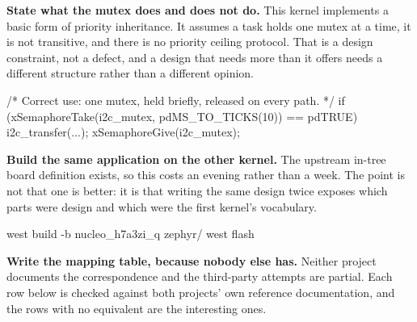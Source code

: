\begin{steps}
\item \textbf{State what the mutex does and does not do.} This kernel
implements a basic form of priority inheritance. It assumes a task holds one
mutex at a time, it is not transitive, and there is no priority ceiling
protocol. That is a design constraint, not a defect, and a design that needs
more than it offers needs a different structure rather than a different
opinion.
\begin{ccode}
/* Correct use: one mutex, held briefly, released on every path. */
if (xSemaphoreTake(i2c_mutex, pdMS_TO_TICKS(10)) == pdTRUE) {
    i2c_transfer(...);
    xSemaphoreGive(i2c_mutex);
}
\end{ccode}

\item \textbf{Build the same application on the other kernel.} The upstream
in-tree board definition exists, so this costs an evening rather than a week.
The point is not that one is better: it is that writing the same design twice
exposes which parts were design and which were the first kernel's vocabulary.
\begin{shellcode}
west build -b nucleo_h7a3zi_q zephyr/
west flash
\end{shellcode}

\item \textbf{Write the mapping table, because nobody else has.} Neither
project documents the correspondence and the third-party attempts are partial.
Each row below is checked against both projects' own reference documentation,
and the rows with no equivalent are the interesting ones.


\end{steps}
